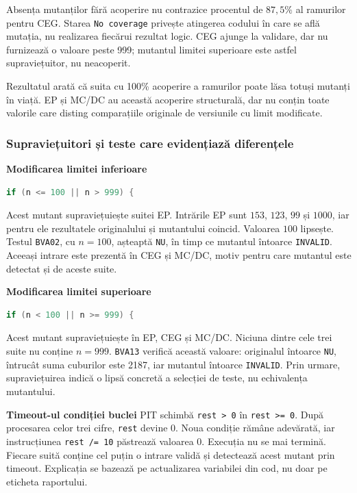 \documentclass[11pt,a4paper]{article}
\begin{document}
Absența mutanților fără acoperire nu contrazice procentul de $87{,}5\%$
al ramurilor pentru CEG. Starea \texttt{No coverage} privește atingerea
codului în care se află mutația, nu realizarea fiecărui rezultat logic.
CEG ajunge la validare, dar nu furnizează o valoare peste 999;
mutantul limitei superioare este astfel supraviețuitor, nu neacoperit.

Rezultatul arată că suita cu 100\% acoperire a ramurilor poate lăsa totuși
mutanți în viață. EP și MC/DC au această acoperire structurală,
dar nu conțin toate valorile care disting comparațiile originale de
versiunile cu limit modificate.

\subsubsection{Supraviețuitori și teste care evidențiază diferențele}
\textbf{Modificarea limitei inferioare}
\begin{lstlisting}[language=Java,firstnumber=2]
if (n <= 100 || n > 999) {
\end{lstlisting}
Acest mutant supraviețuiește suitei EP. Intrările EP sunt $153$, $123$,
$99$ și $1000$, iar pentru ele rezultatele originalului și mutantului coincid.
Valoarea $100$ lipsește. Testul \texttt{BVA02}, cu $n=100$,
așteaptă \texttt{NU}, în timp ce mutantul întoarce \texttt{INVALID}.
Aceeași intrare este prezentă în CEG și MC/DC, motiv pentru care mutantul
este detectat și de aceste suite.

\textbf{Modificarea limitei superioare}
\begin{lstlisting}[language=Java,firstnumber=2]
if (n < 100 || n >= 999) {
\end{lstlisting}
Acest mutant supraviețuiește în EP, CEG și MC/DC.
Niciuna dintre cele trei suite nu conține $n=999$.
\texttt{BVA13} verifică această valoare: originalul întoarce \texttt{NU},
întrucât suma cuburilor este 2187, iar mutantul întoarce \texttt{INVALID}.
Prin urmare, supraviețuirea indică o lipsă concretă a selecției de teste,
nu echivalența mutantului.

\textbf{Timeout-ul condiției buclei}
PIT schimbă \texttt{rest > 0} în \texttt{rest >= 0}.
După procesarea celor trei cifre, \texttt{rest} devine 0.
Noua condiție rămâne adevărată, iar instrucțiunea \texttt{rest /= 10}
păstrează valoarea 0. Execuția nu se mai termină.
Fiecare suită conține cel puțin o intrare validă și detectează acest mutant
prin timeout. Explicația se bazează pe actualizarea variabilei din cod,
nu doar pe eticheta raportului.
\end{document}
